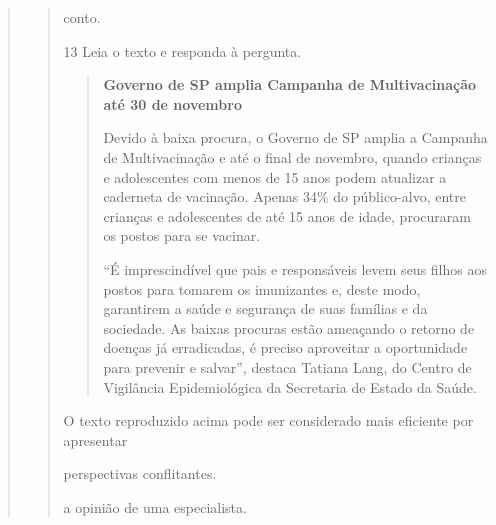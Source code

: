 \begin{escolha}
\begin{escolha}
\begin{escolha}
\begin{quote}
\begin{quote}
\begin{escolha}
  \item conto.
\end{escolha}


\num{13} Leia o texto e responda à pergunta.

\begin{quote}
\textbf{Governo de SP amplia Campanha de Multivacinação até 30 de novembro}

Devido à baixa procura, o Governo de SP amplia a Campanha de
Multivacinação e até o final de novembro, quando crianças e adolescentes
com menos de 15 anos podem atualizar a caderneta de vacinação. Apenas
34\% do público-alvo, entre crianças e adolescentes de até 15 anos de
idade, procuraram os postos para se vacinar.

``É imprescindível que pais e responsáveis levem seus filhos aos postos
para tomarem os imunizantes e, deste modo, garantirem a saúde e
segurança de suas famílias e da sociedade. As baixas procuras estão
ameaçando o retorno de doenças já erradicadas, é preciso aproveitar a
oportunidade para prevenir e salvar'', destaca Tatiana Lang, do Centro de
Vigilância Epidemiológica da Secretaria de Estado da Saúde.
\end{quote}


O texto reproduzido acima pode ser considerado mais eficiente por
apresentar

\begin{escolha}
  \item perspectivas conflitantes.

  \item a opinião de uma especialista.


\end{escolha}
\end{quote}
\end{quote}
\end{escolha}
\end{escolha}
\end{escolha}
